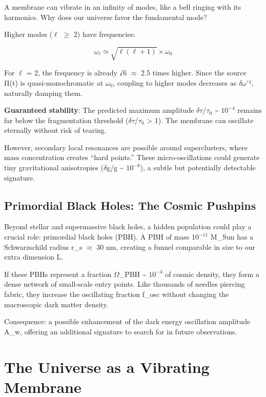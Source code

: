 \documentclass[
  11pt,
]{report}
\begin{document}
A membrane can vibrate in an infinity of modes, like a bell ringing with
its harmonics. Why does our universe favor the fundamental mode?

Higher modes (\(\ell\) \(\geq\) 2) have frequencies:

\[\omega_\ell \simeq \sqrt{\ell(\ell+1)} × \omega_0\]

For \(\ell\) = 2, the frequency is already √6 \(\approx\) 2.5 times
higher. Since the source Π(t) is quasi-monochromatic at \(\omega_0\),
coupling to higher modes decreases as \(\delta\omega\)⁻², naturally
damping them.

\textbf{Guaranteed stability}: The predicted maximum amplitude
\(\delta\tau\)/\(\tau_0\) \textasciitilde{} \(10^{-4}\) remains far
below the fragmentation threshold (\(\delta\tau\)/\(\tau_0\)
\textgreater{} 1). The membrane can oscillate eternally without risk of
tearing.

However, secondary local resonances are possible around superclusters,
where mass concentration creates ``hard points.'' These
micro-oscillations could generate tiny gravitational anisotropies
(\(\delta\)g/g \textasciitilde{} \(10^{-8}\)), a subtle but potentially
detectable signature.

\section{Primordial Black Holes: The Cosmic
Pushpins}\label{primordial-black-holes-the-cosmic-pushpins-1}

Beyond stellar and supermassive black holes, a hidden population could
play a crucial role: primordial black holes (PBH). A PBH of mass
\(10^{-11}\) M\_Sun has a Schwarzschild radius r\_s \(\approx\) 30 nm,
creating a funnel comparable in size to our extra dimension L.

If these PBHs represent a fraction \(\Omega\)\_PBH \textasciitilde{}
\(10^{-4}\) of cosmic density, they form a dense network of small-scale
entry points. Like thousands of needles piercing fabric, they increase
the oscillating fraction f\_osc without changing the macroscopic dark
matter density.

Consequence: a possible enhancement of the dark energy oscillation
amplitude A\_w, offering an additional signature to search for in future
observations.

\newpage

\chapter{The Universe as a Vibrating
Membrane}\label{the-universe-as-a-vibrating-membrane}
\end{document}
